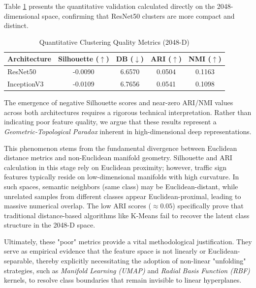 Table \ref{tab:cluster_metrics} presents the quantitative validation calculated directly on the 2048-dimensional space, confirming that ResNet50 clusters are more compact and distinct. 

\begin{table}[H]
    \centering
    \caption{Quantitative Clustering Quality Metrics (2048-D)}
    \label{tab:cluster_metrics}
    \begin{tabular}{lcccc}
        \toprule
        \textbf{Architecture} & \textbf{Silhouette ($\uparrow$)} & \textbf{DB ($\downarrow$)} & \textbf{ARI ($\uparrow$)} & \textbf{NMI ($\uparrow$)} \\
        \midrule
        ResNet50 & -0.0090 & 6.6570 & 0.0504 & 0.1163 \\
        InceptionV3 & -0.0109 & 6.7656 & 0.0541 & 0.1098 \\
        \bottomrule
    \end{tabular}
\end{table}

The emergence of negative Silhouette scores and near-zero ARI/NMI values across both architectures requires a rigorous technical interpretation. Rather than indicating poor feature quality, we argue that these results represent a \textit{Geometric-Topological Paradox} inherent in high-dimensional deep representations. 

This phenomenon stems from the fundamental divergence between Euclidean distance metrics and non-Euclidean manifold geometry. Silhouette and ARI calculation in this stage rely on Euclidean proximity; however, traffic sign features typically reside on low-dimensional manifolds with high curvature. In such spaces, semantic neighbors (same class) may be Euclidean-distant, while unrelated samples from different classes appear Euclidean-proximal, leading to massive numerical overlap. The low ARI scores ($\approx 0.05$) specifically prove that traditional distance-based algorithms like K-Means fail to recover the latent class structure in the 2048-D space.

Ultimately, these "poor" metrics provide a vital methodological justification. They serve as empirical evidence that the feature space is not linearly or Euclidean-separable, thereby explicitly necessitating the adoption of non-linear "unfolding" strategies, such as \textit{Manifold Learning (UMAP)} and \textit{Radial Basis Function (RBF)} kernels, to resolve class boundaries that remain invisible to linear hyperplanes.

